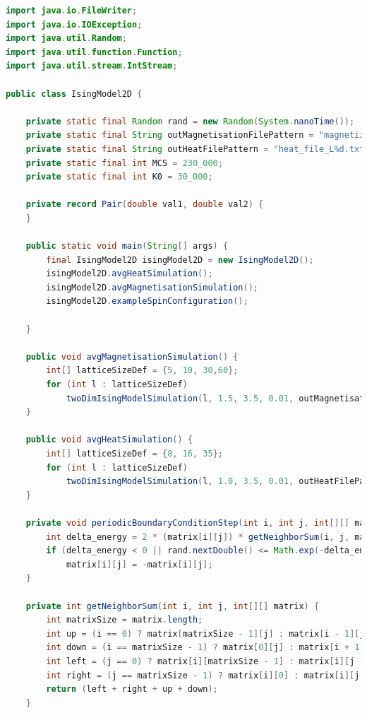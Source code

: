 \documentclass[11pt]{article}
\begin{document}
    \begin{small}
        \begin{lstlisting}[language=Java, frame=lines, numberstyle=\tiny, stepnumber=5,
            caption=Java Simulation Code \label{hibernate-properties}., firstnumber=1,label={lst:code}]
import java.io.FileWriter;
import java.io.IOException;
import java.util.Random;
import java.util.function.Function;
import java.util.stream.IntStream;

public class IsingModel2D {

    private static final Random rand = new Random(System.nanoTime());
    private static final String outMagnetisationFilePattern = "magnetization_file_L%d.txt";
    private static final String outHeatFilePattern = "heat_file_L%d.txt";
    private static final int MCS = 230_000;
    private static final int K0 = 30_000;

    private record Pair(double val1, double val2) {
    }

    public static void main(String[] args) {
        final IsingModel2D isingModel2D = new IsingModel2D();
        isingModel2D.avgHeatSimulation();
        isingModel2D.avgMagnetisationSimulation();
        isingModel2D.exampleSpinConfiguration();

    }

    public void avgMagnetisationSimulation() {
        int[] latticeSizeDef = {5, 10, 30,60};
        for (int l : latticeSizeDef)
            twoDimIsingModelSimulation(l, 1.5, 3.5, 0.01, outMagnetisationFilePattern, Pair::val1);
    }

    public void avgHeatSimulation() {
        int[] latticeSizeDef = {8, 16, 35};
        for (int l : latticeSizeDef)
            twoDimIsingModelSimulation(l, 1.0, 3.5, 0.01, outHeatFilePattern, Pair::val2);
    }

    private void periodicBoundaryConditionStep(int i, int j, int[][] matrix, double tStar) {
        int delta_energy = 2 * (matrix[i][j]) * getNeighborSum(i, j, matrix);
        if (delta_energy < 0 || rand.nextDouble() <= Math.exp(-delta_energy / tStar))
            matrix[i][j] = -matrix[i][j];
    }

    private int getNeighborSum(int i, int j, int[][] matrix) {
        int matrixSize = matrix.length;
        int up = (i == 0) ? matrix[matrixSize - 1][j] : matrix[i - 1][j];
        int down = (i == matrixSize - 1) ? matrix[0][j] : matrix[i + 1][j];
        int left = (j == 0) ? matrix[i][matrixSize - 1] : matrix[i][j - 1];
        int right = (j == matrixSize - 1) ? matrix[i][0] : matrix[i][j + 1];
        return (left + right + up + down);
    }


\end{lstlisting}
\end{small}
\end{document}
